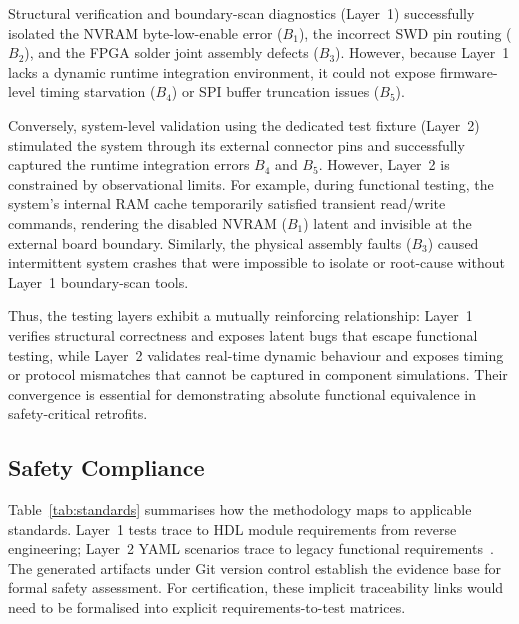 \documentclass[journal, a4paper]{IEEEtran}
\begin{document}
Structural verification and boundary-scan diagnostics (Layer~1) successfully isolated the NVRAM byte-low-enable error ($B_1$), the incorrect SWD pin routing ($B_2$), and the FPGA solder joint assembly defects ($B_3$). However, because Layer~1 lacks a dynamic runtime integration environment, it could not expose firmware-level timing starvation ($B_4$) or SPI buffer truncation issues ($B_5$).

Conversely, system-level validation using the dedicated test fixture (Layer~2) stimulated the system through its external connector pins and successfully captured the runtime integration errors $B_4$ and $B_5$. However, Layer~2 is constrained by observational limits. For example, during functional testing, the system's internal RAM cache temporarily satisfied transient read/write commands, rendering the disabled NVRAM ($B_1$) latent and invisible at the external board boundary. Similarly, the physical assembly faults ($B_3$) caused intermittent system crashes that were impossible to isolate or root-cause without Layer~1 boundary-scan tools.

Thus, the testing layers exhibit a mutually reinforcing relationship: Layer~1 verifies structural correctness and exposes latent bugs that escape functional testing, while Layer~2 validates real-time dynamic behaviour and exposes timing or protocol mismatches that cannot be captured in component simulations. Their convergence is essential for demonstrating absolute functional equivalence in safety-critical retrofits.

\subsection{Safety Compliance}

Table~\ref{tab:standards} summarises how the methodology maps to applicable standards. Layer~1 tests trace to HDL module requirements from reverse engineering; Layer~2 YAML scenarios trace to legacy functional requirements~\cite{rexroth1992wsp}. The generated artifacts under Git version control establish the evidence base for formal safety assessment. For certification, these implicit traceability links would need to be formalised into explicit requirements-to-test matrices.
\end{document}
